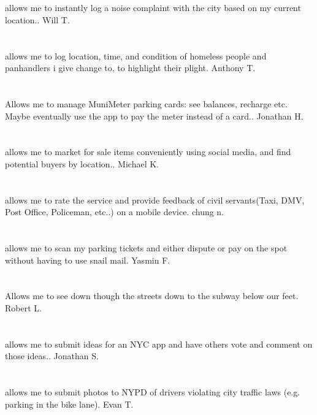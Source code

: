 \section{}allows me to instantly log a noise complaint with the city based on my current location.. Will T.
\section{} allows me to log location,  time,  and condition of homeless people and panhandlers i give change to,  to highlight their plight. Anthony T.
\section{}Allows me to manage MuniMeter parking cards: see balances,  recharge etc. Maybe eventually use the app to pay the meter instead of a card.. Jonathan H.
\section{}allows me to market for sale items conveniently using social media,  and find potential buyers by location.. Michael K.
\section{}allows me to rate the service and provide feedback of civil servants(Taxi,  DMV,  Post Office,  Policeman,  etc..) on a mobile device. chung n.
\section{}allows me to scan my parking tickets and either dispute or pay on the spot without having to use snail mail. Yasmin F.
\section{}Allows me to see down though the streets down to the subway below our feet. Robert L.
\section{}allows me to submit ideas for an NYC app and have others vote and comment on those ideas.. Jonathan S.
\section{}allows me to submit photos to NYPD of drivers violating city traffic laws (e.g. parking in the bike lane). Evan T.
